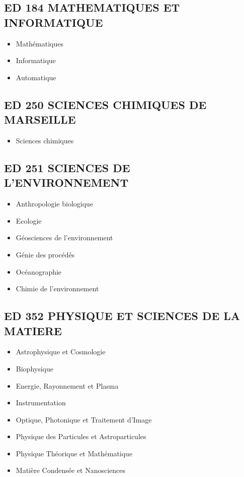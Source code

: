 	\subsection*{ED 184 MATHEMATIQUES ET INFORMATIQUE}\label{ed-184-mathematiques-et-informatique}

		\begin{itemize}
		\item Mathématiques
		\item Informatique
		\item Automatique
		\end{itemize}

	\subsection*{ED 250 SCIENCES CHIMIQUES DE MARSEILLE}\label{ed-250-sciences-chimiques-de-marseille}

		\begin{itemize}
		\item Sciences chimiques
		\end{itemize}

	\subsection*{ED 251 SCIENCES DE L'ENVIRONNEMENT}\label{ed-251-sciences-de-lenvironnement}

		\begin{itemize}
		\item Anthropologie biologique
		\item Ecologie
		\item Géosciences de l'environnement
		\item Génie des procédés
		\item Océanographie
		\item Chimie de l'environnement
		\end{itemize}

	\subsection*{ED 352 PHYSIQUE ET SCIENCES DE LA MATIERE}\label{ed-352-physique-et-sciences-de-la-matiere}

		\begin{itemize}
		\item Astrophysique et Cosmologie
		\item Biophysique
		\item Energie, Rayonnement et Plasma
		\item Instrumentation
		\item Optique, Photonique et Traitement d'Image
		\item Physique des Particules et Astroparticules
		\item Physique Théorique et Mathématique
		\item Matière Condensée et Nanosciences
		\end{itemize}

